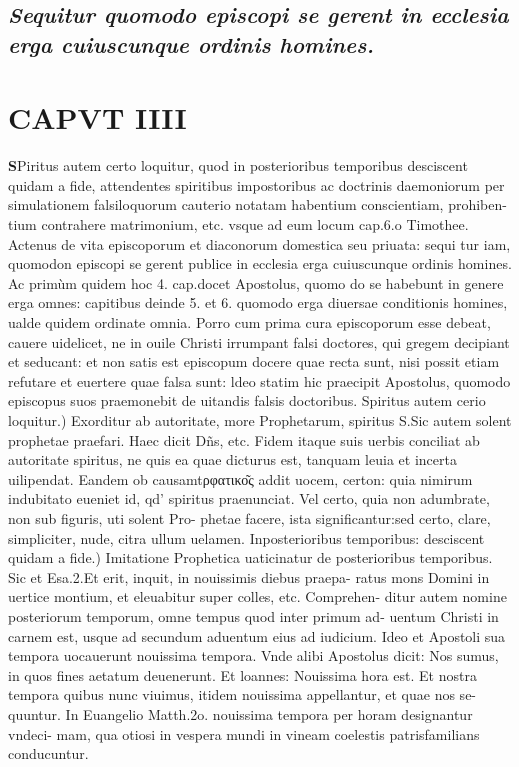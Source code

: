 \documentclass{article}
\begin{document}
\begin{pages}
\subsection*{\textit{Sequitur quomodo episcopi se gerent in ecclesia erga cuiuscunque ordinis homines. }}
\endnumbering\beginnumbering\section{CAPVT IIII}\pstart \huge\textbf{S}\normalsize Piritus autem certo loquitur, quod in posterioribus temporibus desciscent quidam a fide, attendentes spiritibus impostoribus ac doctrinis daemoniorum per simulationem falsiloquorum cauterio notatam habentium conscientiam, prohiben- tium contrahere matrimonium, etc. vsque ad eum locum cap.6.o Timothee. Actenus de vita episcoporum et diaconorum domestica seu priuata: sequi tur iam, quomodon episcopi se gerent publice in ecclesia erga cuiuscunque ordinis homines. Ac primùm quidem hoc 4. cap.docet Apostolus, quomo do se habebunt in genere erga omnes: capitibus deinde 5. et 6. quomodo erga diuersae conditionis homines, ualde quidem ordinate omnia. Porro cum prima cura episcoporum esse debeat, cauere uidelicet, ne in ouile Christi irrumpant falsi doctores, qui gregem decipiant et seducant: et non satis est episcopum docere quae recta sunt, nisi possit etiam refutare et euertere quae falsa sunt: ldeo statim hic praecipit Apostolus, quomodo episcopus suos praemonebit de uitandis falsis doctoribus.  \pend\pstart Spiritus autem cerio loquitur.) Exorditur ab autoritate, more Prophetarum, spiritus S.Sic autem solent prophetae praefari. Haec dicit Dñs, etc. Fidem itaque suis uerbis conciliat ab autoritate spiritus, ne quis ea quae dicturus est, tanquam leuia et incerta uilipendat. Eandem ob causamtρφατικο͂ς addit uocem, certon: quia nimirum indubitato eueniet id, qd' spiritus praenunciat. Vel certo, quia non adumbrate, non sub figuris, uti solent Pro- phetae facere, ista significantur:sed certo, clare, simpliciter, nude, citra ullum uelamen. Inposterioribus temporibus: desciscent quidam a fide.) Imitatione Prophetica uaticinatur de posterioribus temporibus. Sic et Esa.2.Et erit, inquit, in nouissimis diebus praepa- ratus mons Domini in uertice montium, et eleuabitur super colles, etc. Comprehen- ditur autem nomine posteriorum temporum, omne tempus quod inter primum ad- uentum Christi in carnem est, usque ad secundum aduentum eius ad iudicium. Ideo et Apostoli sua tempora uocauerunt nouissima tempora. Vnde alibi Apostolus dicit: Nos sumus, in quos fines aetatum deuenerunt. Et loannes: Nouissima hora est. Et nostra tempora quibus nunc viuimus, itidem nouissima appellantur, et quae nos se- quuntur. In Euangelio Matth.2o. nouissima tempora per horam designantur vndeci- mam, qua otiosi in vespera mundi in vineam coelestis patrisfamilians conducuntur.  \pend

\end{pages}
\end{document}
